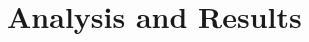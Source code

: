 \documentclass[reprint,%
 amsmath,amssymb,
 aps,
]{revtex4-1}
\begin{document}


  
  
 

 


 








\section{  Analysis and Results \label{sec:analysis}}
 
\end{document}
